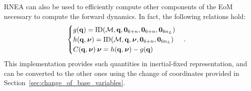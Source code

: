 \ac{RNEA} can also be used to efficiently compute other components of the \ac{EoM} necessary to compute the forward dynamics.
In fact, the following relations hold:
%
\begin{equation*}
    \begin{cases}
        g(\mathbf{q}) = \operatorname{ID}(\mathcal{M}, \mathbf{q}, \boldsymbol{0}_{6+n}, \boldsymbol{0}_{6+n}, \boldsymbol{0}_{6 n_L}) \\
        h(\mathbf{q}, \prescript{}{}{\boldsymbol{\nu}}) = \operatorname{ID}(\mathcal{M}, \mathbf{q}, \prescript{}{}{\boldsymbol{\nu}}, \boldsymbol{0}_{6+n}, \boldsymbol{0}_{6 n_L}) \\
        C(\mathbf{q}, \prescript{}{}{\boldsymbol{\nu}}) \prescript{}{}{\boldsymbol{\nu}} = h(\mathbf{q}, \prescript{}{}{\boldsymbol{\nu}}) - g(\mathbf{q})
\end{cases}
.
\end{equation*}
%
This implementation provides such quantities in inertial-fixed representation, and can be converted to the other ones using the change of coordinates provided in Section~\ref{sec:change_of_base_variables}.

